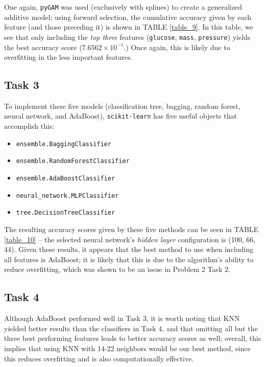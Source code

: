 \documentclass[twoside,twocolumn,10pt]{revtex4-1}
\begin{document}
	One again, \texttt{pyGAM} was used (exclusively with splines) to create a generalized additive model; using forward selection, the cumulative accuracy given by each feature (and those preceding it) is shown in TABLE \ref{table_9}.  In this table, we see that only including the \textit{top three} features (\texttt{glucose}, \texttt{mass}, \texttt{pressure}) yields the best accuracy score ($7.6562 \times 10^{-1}$.) Once again, this is likely due to overfitting in the less important features.
	
	\subsection*{Task 3}
	
	To implement these five models (classification tree, bagging, random forest, neural network, and AdaBoost), \texttt{scikit-learn} has five useful objects that accomplish this:
	
	\begin{itemize}
	\item \texttt{ensemble.BaggingClassifier}
	\item \texttt{ensemble.RandomForestClassifier}
	\item \texttt{ensemble.AdaBoostClassifier}
	\item \texttt{neural\_network.MLPClassifier}
	\item \texttt{tree.DecisionTreeClassifier}
	\end{itemize}
	
	The resulting accuracy scores given by these five methods can be seen in TABLE \ref{table_10} – the selected neural network's \textit{hidden layer} configuration is (100, 66, 44). Given these results, it appears that the best method to use when including all features is AdaBoost; it is likely that this is due to the algorithm's ability to reduce overfitting, which was shown to be an issue in Problem 2 Task 2.
	
	\subsection*{Task 4}
	
	Although AdaBoost performed well in Task 3, it is worth noting that KNN yielded better results than the classifiers in Task 4, and that omitting all but the three best performing features leads to better accuracy scores as well; overall, this implies that using KNN with 14-22 neighbors would be our best method, since this reduces overfitting and is also computationally effective.
	
\end{document}
